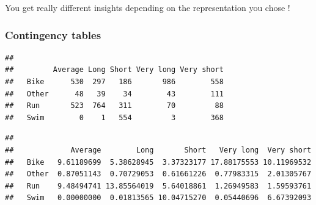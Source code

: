 \documentclass[
]{book}
\newenvironment{Shaded}{\begin{snugshade}}{\end{snugshade}}
\newcommand{\DataTypeTok}[1]{\textcolor[rgb]{0.13,0.29,0.53}{#1}}
\newcommand{\DecValTok}[1]{\textcolor[rgb]{0.00,0.00,0.81}{#1}}
\newcommand{\KeywordTok}[1]{\textcolor[rgb]{0.13,0.29,0.53}{\textbf{#1}}}
\newcommand{\NormalTok}[1]{#1}
\newcommand{\OperatorTok}[1]{\textcolor[rgb]{0.81,0.36,0.00}{\textbf{#1}}}
\newcommand{\StringTok}[1]{\textcolor[rgb]{0.31,0.60,0.02}{#1}}
\begin{document}
You get really different insights depending on the representation you chose !

\hypertarget{contingency-tables-1}{%
\subsubsection{Contingency tables}\label{contingency-tables-1}}

\begin{Shaded}
\end{Shaded}

\begin{verbatim}
##        
##         Average Long Short Very long Very short
##   Bike      530  297   186       986        558
##   Other      48   39    34        43        111
##   Run       523  764   311        70         88
##   Swim        0    1   554         3        368
\end{verbatim}

\begin{Shaded}
\end{Shaded}

\begin{verbatim}
##        
##             Average        Long       Short   Very long  Very short
##   Bike   9.61189699  5.38628945  3.37323177 17.88175553 10.11969532
##   Other  0.87051143  0.70729053  0.61661226  0.77983315  2.01305767
##   Run    9.48494741 13.85564019  5.64018861  1.26949583  1.59593761
##   Swim   0.00000000  0.01813565 10.04715270  0.05440696  6.67392093
\end{verbatim}

\begin{Shaded}
\end{Shaded}
\end{document}

